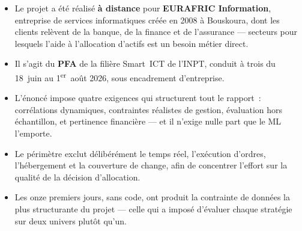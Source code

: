 \begin{itemize}
  \item Le projet a été réalisé \textbf{à distance} pour
        \textbf{EURAFRIC Information}, entreprise de
        services informatiques créée en 2008 à Bouskoura, dont les clients
        relèvent de la banque, de la finance et de l'assurance — secteurs pour
        lesquels l'aide à l'allocation d'actifs est un besoin métier direct.
  \item Il s'agit du \textbf{PFA} de la filière Smart~ICT de l'INPT, conduit à
        trois du 18~juin au 1\textsuperscript{er}~août 2026, sous encadrement
        d'entreprise.
  \item L'énoncé impose quatre exigences qui structurent tout le rapport~:
        corrélations dynamiques, contraintes réalistes de gestion, évaluation
        hors échantillon, et pertinence financière — et il n'exige nulle part que
        le ML l'emporte.
  \item Le périmètre exclut délibérément le temps réel, l'exécution d'ordres,
        l'hébergement et la couverture de change, afin de concentrer l'effort sur
        la qualité de la décision d'allocation.
  \item Les onze premiers jours, sans code, ont produit la contrainte de données
        la plus structurante du projet — celle qui a imposé d'évaluer chaque
        stratégie sur deux univers plutôt qu'un.
\end{itemize}
